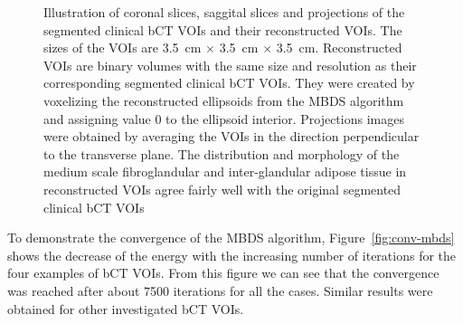 \documentclass[journal]{IEEEtran}
\begin{document}
\begin{figure}[!htb]

  \caption{Illustration of coronal slices, saggital slices and
    projections of the segmented clinical bCT VOIs and their
    reconstructed VOIs. The sizes of the VOIs are \SI{3.5}{\cm}
    $\times$ \SI{3.5}{\cm} $\times$ \SI{3.5}{\cm}. Reconstructed VOIs
    are binary volumes with the same size and resolution as their
    corresponding segmented clinical bCT VOIs. They were created by
    voxelizing the reconstructed ellipsoids from the MBDS algorithm
    and assigning value 0 to the ellipsoid interior. Projections
    images were obtained by averaging the VOIs in the direction
    perpendicular to the transverse plane. The distribution and
    morphology of the medium scale fibroglandular and inter-glandular
    adipose tissue in reconstructed VOIs agree fairly well with the
    original segmented clinical bCT VOIs}
  \label{fig:bct-datasets-recon}

\end{figure}

To demonstrate the convergence of the MBDS algorithm,
Figure~\ref{fig:conv-mbds} shows the decrease of the energy with the
increasing number of iterations for the four examples of bCT
VOIs. From this figure we can see that the convergence was reached
after about 7500 iterations for all the cases. Similar results were
obtained for other investigated bCT VOIs.
\end{document}
